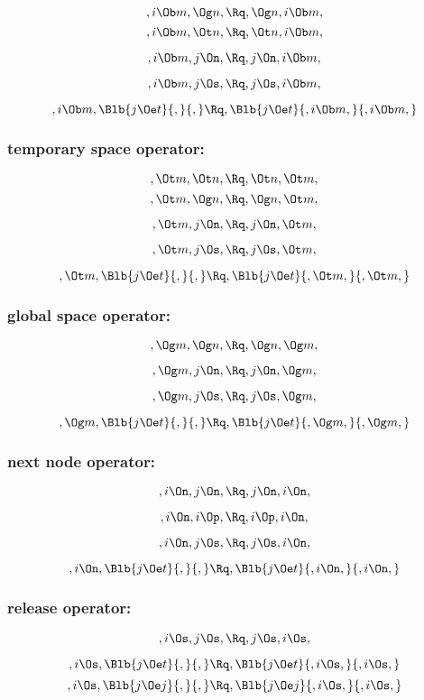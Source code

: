 \[,i \Ob m,  \Og n, \Rq , \Og n, i \Ob m,\]
\[,i \Ob m,  \Ot n, \Rq , \Ot n, i \Ob m,\]

\[,i \Ob m, j \On, \Rq , j \On, i \Ob m,\]

\[,i \Ob m, j \Os, \Rq , j \Os, i \Ob m,\]

\[,i \Ob m, \Blb{j \Oe t}{,}{,} \Rq , \Blb{j \Oe t}{,i \Ob m,}{,i \Ob m,}\]

\bigskip
\subsubsection{temporary space operator:}
\[, \Ot m,  \Ot n, \Rq , \Ot n, \Ot m,\]
\[, \Ot m,  \Og n, \Rq , \Og n, \Ot m,\]

\[, \Ot m, j \On, \Rq , j \On,  \Ot m,\]

\[, \Ot m, j \Os, \Rq , j \Os,  \Ot m,\]

\[, \Ot m, \Blb{j \Oe t}{,}{,} \Rq , \Blb{j \Oe t}{, \Ot m,}{, \Ot m,}\]


\bigskip
\subsubsection{global space operator:}
\[, \Og m,  \Og n, \Rq , \Og n, \Og m,\]

\[, \Og m, j \On, \Rq , j \On,  \Og m,\]

\[, \Og m, j \Os, \Rq , j \Os,  \Og m,\]

\[, \Og m, \Blb{j \Oe t}{,}{,} \Rq , \Blb{j \Oe t}{, \Og m,}{, \Og m,}\]


\bigskip
\subsubsection{next node operator:}

\[,i \On, j \On, \Rq , j \On, i \On,\]

\[,i \On, i \Op, \Rq , i \Op, i \On,\]

\[,i \On, j \Os, \Rq , j \Os,i \On,\]

\[,i \On, \Blb{j \Oe t}{,}{,} \Rq , \Blb{j \Oe t}{,i \On,}{,i \On,}\]



\bigskip
\subsubsection{release operator:}

\[,i \Os, j \Os, \Rq , j \Os,i \Os,\]

\[,i \Os, \Blb{j \Oe t}{,}{,} \Rq , \Blb{j \Oe t}{,i \Os,}{,i \Os,}\]
\[,i \Os, \Blb{j \Oe j}{,}{,} \Rq , \Blb{j \Oe j}{,i \Os,}{,i \Os,}\]

